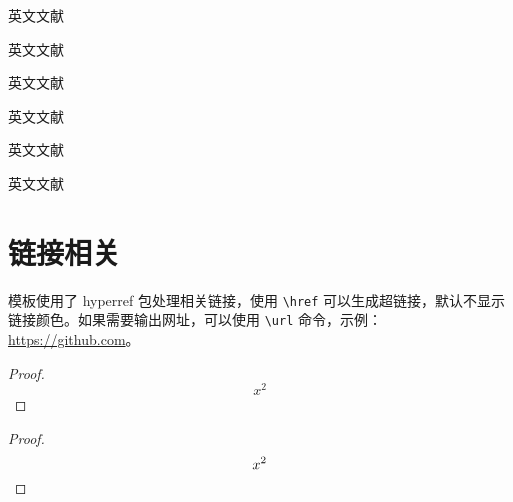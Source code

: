 英文文献 \parencite[Thm1]{feynman2011}

英文文献 \parencite[12][Thm1]{feynman2011}

英文文献 \cite{feynman2011}

英文文献 \cite[12]{feynman2011}

英文文献 \cite[Thm1]{feynman2011}

英文文献 \cite[12][Thm1]{feynman2011}

\section{链接相关}


模板使用了 hyperref 包处理相关链接，使用 \verb|\href| 可以生成超链接，默认不显示链接颜色。如果需要输出网址，可以使用 \verb|\url| 命令，示例：\url{https://github.com}。


\begin{proof}
  \[
    x^2
  \]
\end{proof}
\begin{proof}
  \[
    x^2  \qedhere
  \]
\end{proof}